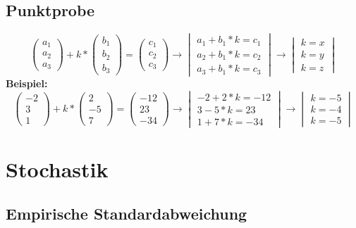 \documentclass[a4paper,12pt]{article}
\begin{document}
	\subsection*{Punktprobe}
		$$
\begin{pmatrix} 
a_{1} \\
a_{2} \\
a_{3}
\end{pmatrix}+k*
\begin{pmatrix} 
b_{1} \\
b_{2} \\
b_{3}
\end{pmatrix}=
\begin{pmatrix} 
c_{1} \\
c_{2} \\
c_{3}
\end{pmatrix} \rightarrow
\begin{vmatrix}
a_{1}+b_{1}*k=c_{1} \\
a_{2}+b_{1}*k=c_{2} \\
a_{3}+b_{1}*k=c_{3}
\end{vmatrix} \rightarrow
\begin{vmatrix}
k=x \\
k=y \\
k=z
\end{vmatrix}
$$
		\textbf{Beispiel:}
			$$
\begin{pmatrix} 
-2 \\
3 \\
1
\end{pmatrix}+k*
\begin{pmatrix} 
2 \\
-5 \\
7
\end{pmatrix}=
\begin{pmatrix} 
-12 \\
23 \\
-34
\end{pmatrix} \rightarrow
\begin{vmatrix}
-2+2*k=-12\\
3-5*k=23\\
1+7*k=-34
\end{vmatrix} \rightarrow
\begin{vmatrix}
k=-5 \\
k=-4 \\
k=-5
\end{vmatrix}
$$
\section*{Stochastik}
	\subsection*{Empirische Standardabweichung}
			
\end{document}
